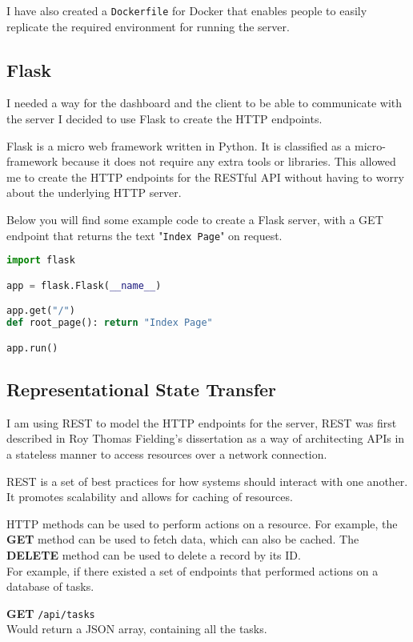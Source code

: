 I have also created a \texttt{Dockerfile} for Docker
that enables people to easily replicate the required
environment for running the server.

\subsection{Flask}
I needed a way for the dashboard and the client to be
able to communicate with the server
I decided to use Flask to create the HTTP endpoints.

Flask is a micro web framework written in Python.
It is classified as a micro-framework because it does
not require any extra tools or libraries.
This allowed me to create the HTTP endpoints for the RESTful API without
having to worry about the underlying HTTP server.

Below you will find some example code to create a Flask server,
with a GET endpoint that returns the text "\texttt{Index Page}" on request.

\begin{lstlisting}[language=Python]
import flask

app = flask.Flask(__name__)

app.get("/")
def root_page(): return "Index Page"

app.run()
\end{lstlisting}

\subsection{Representational State Transfer}
I am using REST to model the HTTP endpoints for the server,
REST was first described in Roy Thomas Fielding's dissertation \cite{REST}
as a way of architecting APIs in a stateless manner to
access resources over a network connection.

REST is a set of best practices for how systems should interact with one another.
It promotes scalability and allows for caching of resources.

HTTP methods can be used to perform actions on a resource.
For example, the \textbf{GET} method can be used to fetch data,
which can also be cached.
The \textbf{DELETE} method can be used to delete a record by its ID. \\

For example, if there existed a set of endpoints that
performed actions on a database of tasks.

\textbf{GET} \texttt{/api/tasks} \\
Would return a JSON array, containing all the tasks.

